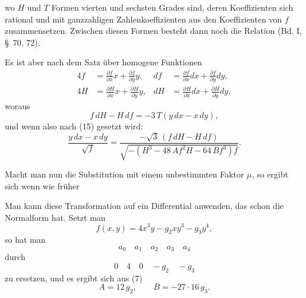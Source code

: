 
wo $H$ und $T$ Formen vierten und sechsten Grades sind, deren
Koeffizienten sich rational und mit ganzzahligen Zahlenkoeffizienten
aus den Koeffizienten von $f$ zusammensetzen. Zwischen diesen
Formen besteht dann noch die Relation
(Bd. I, \S\ 70, 72).

Es ist aber nach dem  Satz über homogene
Funktionen
\[
\begin{aligned}
4f&=\frac{\partial f}{\partial x}x+\frac{\partial f}{\partial y}y,
&df&=\frac{\partial f}{\partial x}dx+\frac{\partial f}{\partial y}dy,\\
4H&=\frac{\partial H}{\partial x}x+\frac{\partial H}{\partial y}y,
&dH&=\frac{\partial H}{\partial x}dx+\frac{\partial H}{\partial y}dy,
\end{aligned}
\]
woraus
\[
f\,dH-H\,df=-3\,T(y\,dx-x\,dy),
\]
und wenn also nach (15)
gesetzt wird:
\[
\frac{y\,dx-x\,dy}{\sqrt{f}} = \frac{-\sqrt{3}\,(f\,dH-H\,df)}{\sqrt{-(H^3-48\,Af^2H-64\,Bf^3)f}}.
\]

Macht man nun die Substitution
mit einem unbestimmten Faktor $\mu$, so ergibt sich
wenn wie früher

Man kann diese Transformation auf ein Differential anwenden,
das schon die Normalform hat. Setzt man
\[
f(x,y) = 4x^3y - g_2xy^3 - g_3y^4,
\]
so hat man
\[
a_0\quad a_1\quad a_2\quad a_3\quad a_4
\]
durch
\[
0\quad 4\quad 0\quad -g_2\quad -g_3
\]
zu ersetzen, und es ergibt sich aus (7)
\[
A = 12\,g_2, \qquad B = -27\cdot 16\,g_3.
\]
